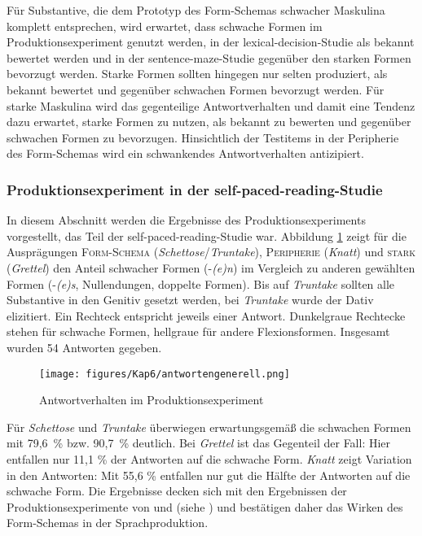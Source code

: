  
Für Substantive, die dem Prototyp des Form-Schemas schwacher Maskulina komplett entsprechen, wird erwartet, dass schwache Formen im Produktionsexperiment genutzt werden, in der lexical-decision-Studie als bekannt bewertet werden und in der sentence-maze-Studie gegenüber den starken Formen bevorzugt werden. Starke Formen sollten hingegen nur selten produziert, als bekannt bewertet und gegenüber schwachen Formen bevorzugt werden. Für starke Maskulina wird das gegenteilige Antwortverhalten und damit eine Tendenz dazu erwartet, starke Formen zu nutzen, als bekannt zu bewerten und gegenüber schwachen Formen zu bevorzugen. Hinsichtlich der Testitems in der Peripherie des Form-Schemas wird ein schwankendes Antwortverhalten antizipiert.

\subsubsection{Produktionsexperiment in der self-paced-reading-Studie}\largerpage
\begin{sloppypar}
In diesem Abschnitt werden die Ergebnisse des Produktionsexperiments vorgestellt, das Teil der self-paced-reading-Studie war. Abbildung \ref{antwortueberblick} zeigt für die Aus\-prä\-gungen \textsc{Form-Schema} (\textit{Schettose}/\textit{Truntake}), \textsc{Peripherie} (\textit{Knatt}) und \textsc{stark} (\textit{Grettel}) den Anteil schwacher Formen (-\textit{(e)n}) im Vergleich zu anderen gewählten Formen (-\textit{(e)s}, Nullendungen, doppelte Formen). Bis auf \textit{Truntake} sollten alle Substantive in den Genitiv gesetzt werden, bei \textit{Truntake} wurde der Dativ elizitiert. Ein Rechteck entspricht jeweils einer Antwort. Dunkelgraue Rechtecke stehen für schwache Formen, hellgraue für andere Flexionsformen. Insgesamt wurden 54 Antworten gegeben. 
\end{sloppypar}

\begin{figure}
\texttt{[image: figures/Kap6/antwortengenerell.png]} 
\caption{Antwortverhalten im Produktionsexperiment}
\label{antwortueberblick}
\end{figure}

Für \textit{Schettose} und \textit{Truntake} überwiegen erwartungsgemäß die schwachen Formen mit 79,6~\% bzw. 90,7~\% deutlich. Bei \textit{Grettel} ist das Gegenteil der Fall: Hier entfallen nur 11,1 \% der Antworten auf die schwache Form. \textit{Knatt} zeigt Variation in den Antworten: Mit 55,6 \%  entfallen nur gut die Hälfte der Antworten auf die schwache Form. Die Ergebnisse decken sich mit den Ergebnissen der Produktionsexperimente von \textcite{Kopcke.2000b} und \textcite{Schmitt.2019} (siehe ) und bestätigen daher das Wirken des Form-Schemas in der Sprachproduktion.

